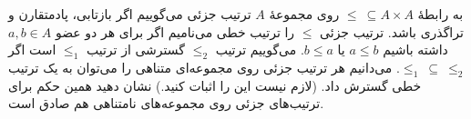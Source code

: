 به رابطهٔ
$\leq\ \subseteq A\times A$
روی مجموعهٔ
$A$
ترتیب جزئی می‌گوییم اگر بازتابی، پادمتقارن و تراگذری باشد. ترتیب جزئی
$\leq$
را ترتیب خطی می‌نامیم اگر برای هر دو عضو
$a,b\in A$
داشته باشیم
$a\leq b$
یا
$b\leq a$.
می‌گوییم ترتیب
$\leq_2$
گسترشی از ترتیب
$\leq_1$
است اگر
$\leq_1\ \subseteq\ \leq_2$.
می‌دانیم هر ترتیب جزئی روی مجموعه‌ای متناهی را می‌توان به یک ترتیب خطی گسترش داد. (لازم نیست این را اثبات کنید.)
نشان دهید همین حکم برای ترتیب‌های جزئی روی مجموعه‌های نامتناهی هم صادق است.

